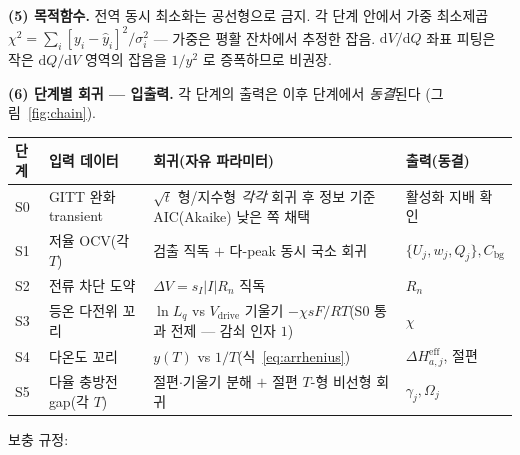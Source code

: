 \documentclass[11pt,a4paper]{article}
\newcommand{\dd}{\mathrm{d}}
\newcommand{\eff}{\mathrm{eff}}
\newcommand{\drive}{\mathrm{drive}}
\newcommand{\bg}{\mathrm{bg}}
\begin{document}
\textbf{(5) 목적함수.} 전역 동시 최소화는 공선형으로 금지. 각 단계 안에서 가중 최소제곱
$\chi^2=\sum_i[y_i-\widehat y_i]^2/\sigma_i^2$ — 가중은 평활 잔차에서 추정한 잡음. $\dd V/\dd Q$
좌표 피팅은 작은 $\dd Q/\dd V$ 영역의 잡음을 $1/y^2$ 로 증폭하므로 비권장.

\textbf{(6) 단계별 회귀 — 입출력.} 각 단계의 출력은 이후 단계에서 \emph{동결}된다
(그림~\ref{fig:chain}).
\begin{center}
\renewcommand{\arraystretch}{1.35}
\begin{tabular}{p{} p{} p{} p{}}
\toprule
단계 & 입력 데이터 & 회귀(자유 파라미터) & 출력(동결) \\
\midrule
S0 & GITT 완화 transient & $\sqrt t$ 형/지수형 \emph{각각} 회귀 후 정보 기준 AIC(Akaike) 낮은 쪽 채택 & 활성화 지배 확인 \\
S1 & 저율 OCV(각 $T$) & 검출 직독 $+$ 다-peak 동시 국소 회귀 & $\{U_j,w_j,Q_j\},C_\bg$ \\
S2 & 전류 차단 도약 & $\Delta V=s_I|I|R_n$ 직독 & $R_n$ \\
S3 & 등온 다전위 꼬리 & $\ln L_q$ vs $V_\drive$ 기울기 $-\chi sF/RT$(S0 통과 전제 — 감쇠 인자 $1$) & $\chi$ \\
S4 & 다온도 꼬리 & $y(T)$ vs $1/T$(식~\eqref{eq:arrhenius}) & $\Delta H_{a,j}^{\eff}$, 절편 \\
S5 & 다율 충방전 gap(각 $T$) & 절편$\cdot$기울기 분해 $+$ 절편 $T$-형 비선형 회귀 & $\gamma_j,\Omega_j$ \\
\bottomrule
\end{tabular}
\end{center}
보충 규정:
\end{document}
